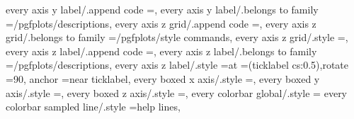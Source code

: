 {{{every axis y label/.append code                                    ={},                                                                         
every axis y label/.belongs to family                              =/pgfplots/descriptions,                                                                                                            
every axis z grid/.append code                                     ={},                                                                          
every axis z grid/.belongs to family                               =/pgfplots/style commands,                                                                                                          
every axis z grid/.style                                           ={},                                                                                                                                
every axis z label/.append code                                    ={},                                                                         
every axis z label/.belongs to family                              =/pgfplots/descriptions,                                                                                                            
every axis z label/.style                                          ={at                                                                                                                                ={(ticklabel cs:0.5)},rotate                               =90, anchor                                                                                                               =near ticklabel},
every boxed x axis/.style                                          ={},                                                                                                                                
every boxed y axis/.style                                          ={},                                                                                                                                
every boxed z axis/.style                                          ={},                                                                                                                                
every colorbar global/.style                                       ={                                                                                                                                  
every colorbar sampled line/.style                                 ={help lines},                                                                                                                      
}}}}

